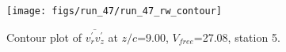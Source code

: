 \begin{figure}[H]
\centering
\texttt{[image: figs/run\_47/run\_47\_rw\_contour]}
\caption{Contour plot of $\overline{v_{r}^{\prime} v_{z}^{\prime}}$ at $z/c$=9.00, $V_{free}$=27.08, station 5.}
\label{fig:run_47_rw_contour}
\end{figure}


